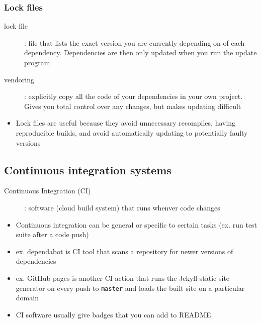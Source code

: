 \documentclass[letterpaper,12pt]{article}
\begin{document}
\subsubsection{Lock files}

\begin{description}
 \item[lock file]: file that lists the exact version you are currently depending on of each dependency. Dependencies are then only updated when you run the update program
 \item[vendoring]: explicitly copy all the code of your dependencies in your own project. Gives you total control over any changes, but makes updating difficult
\end{description}

\begin{itemize}
 \item Lock files are useful because they avoid unnecessary recompiles, having reproducible builds, and avoid automatically updating to potentially faulty versions
\end{itemize}

\subsection{Continuous integration systems}
\begin{description}
 \item[Continuous Integration (CI)]: software (cloud build system) that runs whenver code changes
\end{description}

\begin{itemize}
 \item Continuous integration can be general or specific to certain tasks (ex. run test suite after a code push)
 \item ex. dependabot is CI tool that scans a repository for newer versions of dependencies
 \item ex. GitHub pages is another CI action that runs the Jekyll static site generator on every push to \lstinline{master} and loads the built site on a particular domain
 \item CI software usually give badges that you can add to README
\end{itemize}
\end{document}
